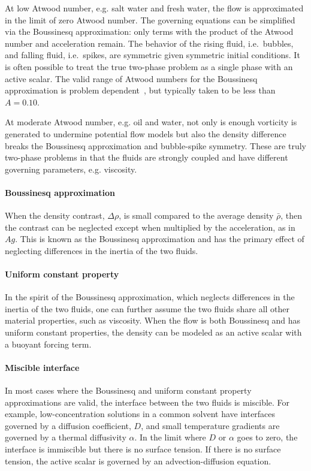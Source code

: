 At low Atwood number, e.g. salt water and fresh water, the flow is approximated in the limit of zero Atwood number.
The governing equations can be simplified via the Boussinesq approximation: only terms with the product of the Atwood number and acceleration remain.
The behavior of the rising fluid, i.e.\ bubbles, and falling fluid, i.e.\ spikes, are symmetric given symmetric initial conditions.
It is often possible to treat the true two-phase problem as a single phase with an active scalar.
The valid range of Atwood numbers for the Boussinesq approximation is problem dependent~\cite{Mikaelian2014}, but typically taken to be less than $A = 0.10$.

At moderate Atwood number, e.g. oil and water, not only is enough vorticity is generated to undermine potential flow models but also the density difference breaks the Boussinesq approximation and bubble-spike symmetry.
These are truly two-phase problems in that the fluids are strongly coupled and have different governing parameters, e.g. viscosity.

\paragraph{Boussinesq approximation}
When the density contrast, $\Delta \rho$, is small compared to the average density $\bar{\rho}$, then 
the contrast can be neglected except when multiplied by the acceleration, as in $Ag$.
This is known as the Boussinesq approximation and has the primary effect of neglecting differences in the inertia of the two fluids.

\paragraph{Uniform constant property}
In the spirit of the Boussinesq approximation, which neglects differences in the inertia of the two fluids, one can further assume the two fluids share all other material properties, such as viscosity.
When the flow is both Boussinesq and has uniform constant properties, the density can be modeled as an active scalar with a buoyant forcing term.

\paragraph{Miscible interface}
In most cases where the Boussinesq and uniform constant property approximations are valid, the interface between the two fluids is miscible.
For example, low-concentration solutions in a common solvent have interfaces governed by a diffusion coefficient, $D$, and small temperature gradients are governed by a thermal diffusivity $\alpha$.
In the limit where $D$ or $\alpha$ goes to zero, the interface is immiscible but there is no surface tension.
If there is no surface tension, the active scalar is governed by an advection-diffusion equation.

